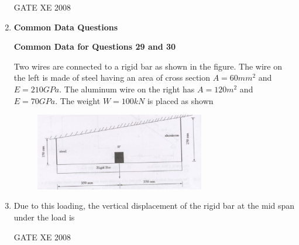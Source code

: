 \documentclass[12pt]{article}
\begin{document}
\begin{enumerate}
\begin{enumerate}
\end{enumerate}
    
    GATE XE 2008  

\item[] \textbf{\Large Common Data Questions}

\textbf{Common Data for Questions 29 and 30}

Two wires are connected to a rigid bar as shown in the figure. The wire on the left is made of steel having an area of cross section $A = 60 mm^2$ and $E = 210 GPa$. The aluminum wire on the right has $A = 120 m^2$ and $E = 70 GPa$. The weight $W = 100 kN$ is placed as shown

    \begin{figure}[H]
    \centering
    \includegraphics[width=0.7\textwidth]{figs/ass1_f_q29.png}
    \caption{}
    \end{figure}


\item Due to this loading, the vertical displacement of the rigid bar at the mid span under the load is  

\begin{enumerate}
\end{enumerate}

GATE XE 2008


\end{enumerate}
\end{document}
